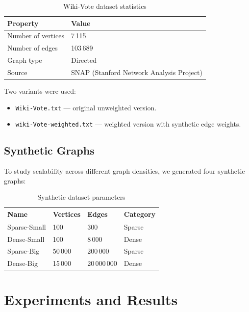 \documentclass[12pt,a4paper]{article}
\begin{document}
\begin{table}[H]
\centering
\caption{Wiki-Vote dataset statistics}
\begin{tabular}{ll}
\toprule
\textbf{Property} & \textbf{Value} \\
\midrule
Number of vertices & 7\,115 \\
Number of edges    & 103\,689 \\
Graph type         & Directed \\
Source             & SNAP (Stanford Network Analysis Project) \\
\bottomrule
\end{tabular}
\end{table}

Two variants were used:
\begin{itemize}
  \item \texttt{Wiki-Vote.txt} — original unweighted version.
  \item \texttt{wiki-Vote-weighted.txt} — weighted version with synthetic edge weights.
\end{itemize}

\subsection{Synthetic Graphs}
To study scalability across different graph densities, we generated four synthetic graphs:

\begin{table}[H]
\centering
\caption{Synthetic dataset parameters}
\begin{tabular}{llll}
\toprule
\textbf{Name} & \textbf{Vertices} & \textbf{Edges} & \textbf{Category} \\
\midrule
Sparse-Small   & 100    & 300        & Sparse  \\
Dense-Small    & 100    & 8\,000     & Dense   \\
Sparse-Big     & 50\,000 & 200\,000  & Sparse  \\
Dense-Big      & 15\,000 & 20\,000\,000 & Dense \\
\bottomrule
\end{tabular}
\end{table}

\section{Experiments and Results}
\label{sec:experiments}
\end{document}
